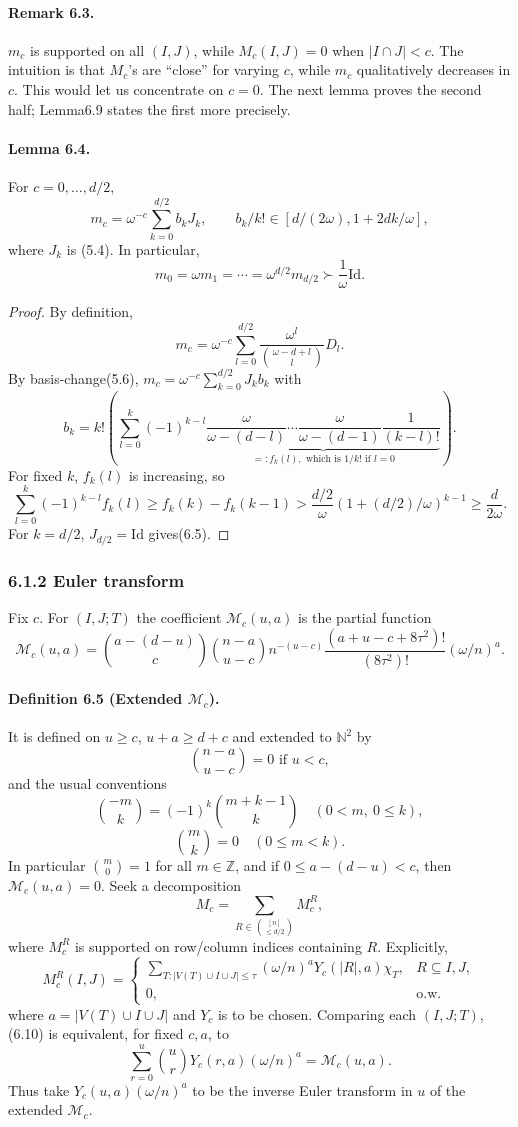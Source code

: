 \paragraph{Remark 6.3.} $m_c$ is supported on all $(I,J)$, while $M_c(I,J)=0$ when $|I\cap J|<c$. The intuition is that $M_c$'s are ``close'' for varying $c$, while $m_c$ qualitatively decreases in $c$. This would let us concentrate on $c=0$. The next lemma proves the second half; Lemma6.9 states the first more precisely.
\paragraph{Lemma 6.4.} For $c=0,\ldots,d/2$,
\[m_c=\omega^{-c}\sum_{k=0}^{d/2}b_kJ_k,\qquad b_k/k!\in[d/(2\omega),1+2dk/\omega],\]
where $J_k$ is (5.4). In particular,
\[m_0=\omega m_1=\cdots=\omega^{d/2}m_{d/2}\succ\frac1\omega\mathrm{Id}.\tag{6.5}\]
\begin{proof}By definition,
\[m_c=\omega^{-c}\sum_{l=0}^{d/2}\frac{\omega^l}{\binom{\omega-d+l}l}D_l.\]
By basis-change(5.6), $m_c=\omega^{-c}\sum_{k=0}^{d/2}J_kb_k$ with
\[b_k=k!\left(\sum_{l=0}^k(-1)^{k-l}\underbrace{\frac\omega{\omega-(d-l)}\cdots\frac\omega{\omega-(d-1)}\frac1{(k-l)!}}_{=:f_k(l),\text{ which is }1/k!\text{ if }l=0}\right).\]
For fixed $k$, $f_k(l)$ is increasing, so
\[\sum_{l=0}^k(-1)^{k-l}f_k(l)\ge f_k(k)-f_k(k-1)>\frac{d/2}\omega(1+(d/2)/\omega)^{k-1}\ge\frac d{2\omega}.\]
For $k=d/2$, $J_{d/2}=\mathrm{Id}$ gives(6.5).\end{proof}
\subsubsection*{6.1.2 Euler transform}
Fix $c$. For $(I,J;T)$ the coefficient $\mathcal M_c(u,a)$ is the partial function
\[\mathcal M_c(u,a)=\binom{a-(d-u)}c\binom{n-a}{u-c}n^{-(u-c)}\frac{(a+u-c+8\tau^2)!}{(8\tau^2)!}(\omega/n)^a.\tag{6.6}\]
\paragraph{Definition 6.5 (Extended $\mathcal M_c$).} It is defined on $u\ge c$, $u+a\ge d+c$ and extended to $\mathbb N^2$ by
\[\binom{n-a}{u-c}=0\text{ if }u<c,\tag{6.7}\]
and the usual conventions
\[\binom{-m}k=(-1)^k\binom{m+k-1}k\quad(0<m,\ 0\le k),\tag{6.8}\]
\[\binom mk=0\quad(0\le m<k).\tag{6.9}\]
In particular $\binom m0=1$ for all $m\in\mathbb Z$, and if $0\le a-(d-u)<c$, then $\mathcal M_c(u,a)=0$.
Seek a decomposition
\[M_c=\sum_{R\in\binom{[n]}{\le d/2}}M_c^R,\tag{6.10}\]
where $M_c^R$ is supported on row/column indices containing $R$. Explicitly,
\[M_c^R(I,J)=\begin{cases}\sum_{T:|V(T)\cup I\cup J|\le\tau}(\omega/n)^aY_c(|R|,a)\chi_T,&R\subseteq I,J,\\0,&\text{o.w.}\end{cases}\tag{6.11}\]
where $a=|V(T)\cup I\cup J|$ and $Y_c$ is to be chosen. Comparing each $(I,J;T)$, (6.10) is equivalent, for fixed $c,a$, to
\[\sum_{r=0}^u\binom urY_c(r,a)(\omega/n)^a=\mathcal M_c(u,a).\tag{6.12}\]
Thus take $Y_c(u,a)(\omega/n)^a$ to be the inverse Euler transform in $u$ of the extended $\mathcal M_c$.

